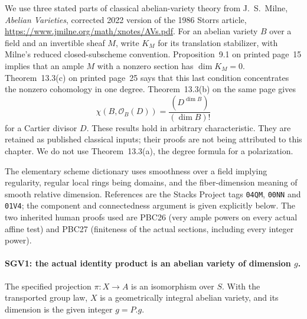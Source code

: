 We use three stated parts of classical abelian-variety theory from
J.~S.~Milne, \emph{Abelian Varieties}, corrected 2022 version of the
1986 Storrs article,
\url{https://www.jmilne.org/math/xnotes/AVs.pdf}.
For an abelian variety $B$ over a field and an invertible sheaf $M$,
write $K_M$ for its translation stabilizer, with Milne's reduced
closed-subscheme convention.  Proposition~9.1 on printed page~15
implies that an ample $M$ with a nonzero section has
$\dim K_M=0$.  Theorem~13.3(c) on printed page~25 says that this last
condition concentrates the nonzero cohomology in one degree.
Theorem~13.3(b) on the same page gives
\[
 \chi(B,\mathcal O_B(D))=\frac{(D^{\dim B})}{(\dim B)!}
                                                        \tag{SGV.2}
\]
for a Cartier divisor $D$.  These results hold in arbitrary
characteristic.  They are retained as published classical inputs;
their proofs are not being attributed to this chapter.  We do not
use Theorem~13.3(a), the degree formula for a polarization.

The elementary scheme dictionary uses smoothness over a field implying
regularity, regular local rings being domains, and the fiber-dimension
meaning of smooth relative dimension.  References are the Stacks
Project tags \nolinkurl{04QM}, \nolinkurl{00NN} and
\nolinkurl{01V4}; the component and connectedness argument is given
explicitly below.  The two inherited human proofs used are PBC26
(very ample powers on every actual affine test) and PBC27 (finiteness
of the actual sections, including every integer power).

\paragraph{SGV1: the actual identity product is an abelian variety of dimension \(g\).}
\label{claim:SGV1}
The specified projection $\pi:X\to A$ is an isomorphism over $S$.
With the transported group law, $X$ is a geometrically integral
abelian variety, and its dimension is the given integer $g=P.g$.

